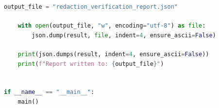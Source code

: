 \begin{lstlisting}[language=Python, caption={Pixel-level verification script for exported redaction}, label={lst:redaction-verification-script}]
    output_file = "redaction_verification_report.json"

    with open(output_file, "w", encoding="utf-8") as file:
        json.dump(result, file, indent=4, ensure_ascii=False)

    print(json.dumps(result, indent=4, ensure_ascii=False))
    print(f"Report written to: {output_file}")


if __name__ == "__main__":
    main()
\end{lstlisting}